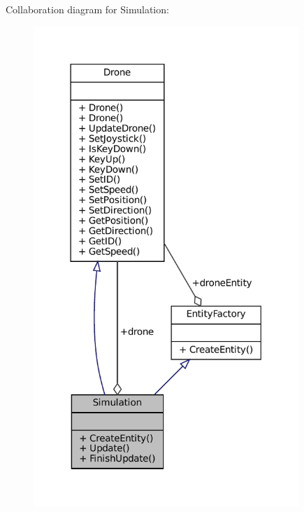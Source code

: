 Collaboration diagram for Simulation\+:\nopagebreak
\begin{figure}[H]
\begin{center}
\leavevmode
\includegraphics[width=284pt]{classSimulation__coll__graph}
\end{center}
\end{figure}
